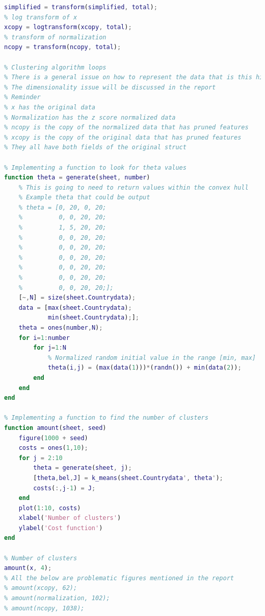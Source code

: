 \documentclass[12pt, a4paper]{article}
\begin{document}
\begin{lstlisting}[language=Matlab, label=lst:final, caption=The entire code as it was upon completion.]
% Regular transform of x
simplified = transform(simplified, total);
% log transform of x
xcopy = logtransform(xcopy, total);
% transform of normalization
ncopy = transform(ncopy, total);

% Clustering algorithm loops
% There is a general issue on how to represent the data that is this hight in dimensions
% The dimensionality issue will be discussed in the report
% Reminder
% x has the original data
% Normalization has the z score normalized data
% ncopy is the copy of the normalized data that has pruned features
% xcopy is the copy of the original data that has pruned features
% They all have both fields of the original struct

% Implementing a function to look for theta values
function theta = generate(sheet, number)
    % This is going to need to return values within the convex hull
    % Example theta that could be output
    % theta = [0, 20, 0, 20;
    %          0, 0, 20, 20;
    %          1, 5, 20, 20;
    %          0, 0, 20, 20;
    %          0, 0, 20, 20;
    %          0, 0, 20, 20;
    %          0, 0, 20, 20;
    %          0, 0, 20, 20;
    %          0, 0, 20, 20;];
    [~,N] = size(sheet.Countrydata);
    data = [max(sheet.Countrydata);
            min(sheet.Countrydata);];
    theta = ones(number,N);
    for i=1:number
        for j=1:N
            % Normalized random initial value in the range [min, max]
            theta(i,j) = (max(data(1)))*(randn()) + min(data(2));
        end
    end
end

% Implementing a function to find the number of clusters
function amount(sheet, seed)
    figure(1000 + seed)
    costs = ones(1,10);
    for j = 2:10
        theta = generate(sheet, j);
        [theta,bel,J] = k_means(sheet.Countrydata', theta');
        costs(:,j-1) = J;
    end
    plot(1:10, costs)
    xlabel('Number of clusters')
    ylabel('Cost function')
end

% Number of clusters
amount(x, 4);
% All the below are problematic figures mentioned in the report
% amount(xcopy, 62);
% amount(normalization, 102);
% amount(ncopy, 1038);


\end{lstlisting}
\end{document}
